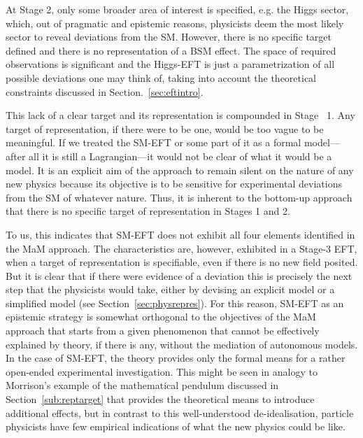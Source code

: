 At Stage 2, only some broader area of interest is specified, e.g. the Higgs sector, which, 
out of pragmatic and epistemic reasons, physicists deem the most likely sector to reveal deviations from the SM.
However, there is no specific target defined and there is no representation of a BSM effect.
The space of required observations is significant and the Higgs-EFT is just a parametrization of all possible deviations one may think of, taking into account the theoretical constraints discussed in Section.~\ref{sec:eftintro}. 

This lack of a clear target and its representation is compounded in Stage~ 1. Any target of representation, if there were to be one, would be too vague to be meaningful. 
If we treated the SM-EFT or some part of it as a formal model---after all it is still a Lagrangian---it would not be clear of what it would be a model.
It is an explicit aim of the approach to remain silent on the nature of any new physics because its objective is to be sensitive for experimental deviations from the SM of whatever nature. 
Thus, it is inherent to the bottom-up approach that there is no specific target of representation in Stages 1 and 2.

To us, this indicates that SM-EFT does not exhibit all four elements identified in the MaM approach. 
The characteristics are, however, exhibited in a Stage-3 EFT, when a target of representation is specifiable, even if there is no new field posited.  
But it is clear that if there were evidence of a deviation this is precisely the next step that the physicists would take, either by devising an explicit model or a simplified model (see Section~\ref{sec:physrepres}). 
For this reason, SM-EFT as an epistemic strategy is somewhat orthogonal to the objectives of the MaM approach that starts from a given phenomenon that cannot be effectively explained by theory, if there is any, without the mediation of autonomous models. In the case of SM-EFT, the theory provides only the formal means for a rather open-ended experimental investigation. 
This might be seen in analogy to Morrison's example of the mathematical pendulum discussed in Section~\ref{sub:reptarget} that provides the theoretical means to introduce additional effects, but in contrast to this well-understood de-idealisation, particle physicists have few empirical indications of what the new physics could be like.


